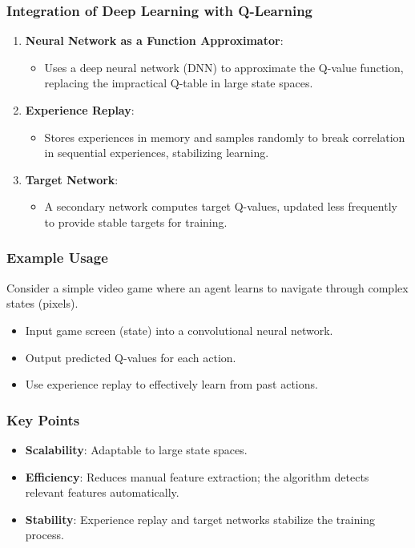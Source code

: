 \documentclass[aspectratio=169]{beamer}
\begin{document}
\begin{frame}[fragile]
    \frametitle{Integration of Deep Learning with Q-Learning}
    \begin{enumerate}
        \item \textbf{Neural Network as a Function Approximator}:
            \begin{itemize}
                \item Uses a deep neural network (DNN) to approximate the Q-value function, replacing the impractical Q-table in large state spaces.
            \end{itemize}
        \item \textbf{Experience Replay}:
            \begin{itemize}
                \item Stores experiences in memory and samples randomly to break correlation in sequential experiences, stabilizing learning.
            \end{itemize}
        \item \textbf{Target Network}:
            \begin{itemize}
                \item A secondary network computes target Q-values, updated less frequently to provide stable targets for training.
            \end{itemize}
    \end{enumerate}
\end{frame}

\begin{frame}[fragile]
    \frametitle{Example Usage}
    Consider a simple video game where an agent learns to navigate through complex states (pixels). 
    \begin{itemize}
        \item Input game screen (state) into a convolutional neural network.
        \item Output predicted Q-values for each action.
        \item Use experience replay to effectively learn from past actions.
    \end{itemize}
\end{frame}

\begin{frame}[fragile]
    \frametitle{Key Points}
    \begin{itemize}
        \item \textbf{Scalability}: Adaptable to large state spaces.
        \item \textbf{Efficiency}: Reduces manual feature extraction; the algorithm detects relevant features automatically.
        \item \textbf{Stability}: Experience replay and target networks stabilize the training process.
    \end{itemize}
\end{frame}
\end{document}
